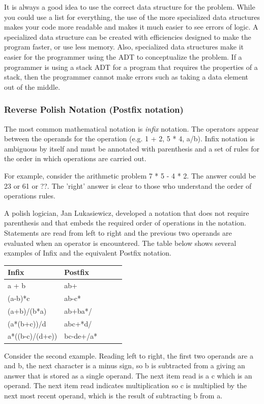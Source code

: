     It is always a good idea to use the correct data structure for the problem.
    While you could use a list for everything, the use of the more specialized
    data structures makes your code more readable and makes it much easier to
    see errors of logic. A specialized data structure can be created with
    efficiencies designed to make the program faster, or use less memory. Also,
    specialized data structures make it easier for the programmer using the ADT
    to conceptualize the problem. If a programmer is using a stack ADT for a
    program that requires the properties of a stack, then the programmer cannot
    make errors such as taking a data element out of the middle. 



\subsubsection{Reverse Polish Notation (Postfix notation)}
    The most common mathematical notation is \emph{infix} notation. The
    operators appear between the operands for the operation (e.g. 1 + 2, 5 *
    4, a/b). Infix notation is ambiguous by itself and must be annotated with
    parenthesis and a set of rules for the order in which operations are carried
    out.
    
    For example, consider the arithmetic problem 7 * 5 - 4 * 2. The answer
    could be 23 or 61 or ??. The 'right' answer is clear to those who
    understand the order of operations rules.

    A polish logician, Jan Lukasiewicz, developed a notation that does not
    require parenthesis and that embeds the required order of operations in the
    notation. Statements are read from left to right and the previous two
    operands are evaluated when an operator is encountered. The table below
    shows several examples of Infix and the equivalent Postfix notation. \newline

\begin{tabular}{lllll}
\hline
Infix           & Postfix   &  &  &  \\ \hline
a + b           & ab+       &  &  &  \\
(a-b)*c         & ab-c*     &  &  &  \\
(a+b)/(b*a)     & ab+ba*/   &  &  &  \\ \hline
(a*(b+c))/d     & abc+*d/   &  &  &  \\
a*((b-c)/(d+e)) & bc-de+/a* &  &  & 
\end{tabular}
    \newline Consider the second example. Reading left to right, the first two operands are a and b, the next character is a minus sign, so b is subtracted from a giving an answer that is stored as a single operand. The next item read is a c which is an operand. The next item read indicates multiplication so c is multiplied by the next most recent operand, which is the result of subtracting b from a.

